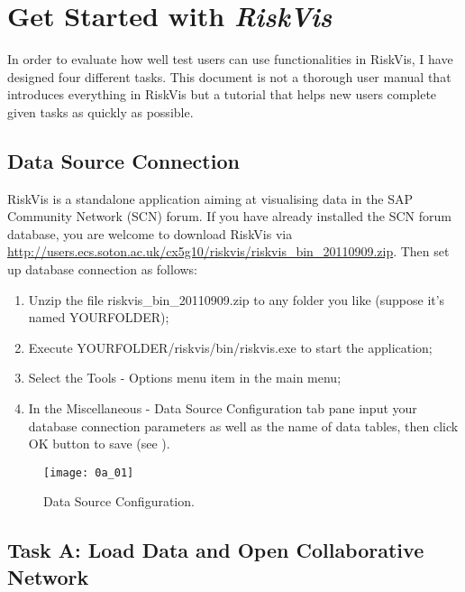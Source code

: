 \chapter{Get Started with \emph{RiskVis}} \label{Chapter:AppendixA}

In order to evaluate how well test users can use functionalities in RiskVis, I have designed four different tasks. This document is not a thorough user manual that introduces everything in RiskVis but a tutorial that helps new users complete given tasks as quickly as possible.

\section{Data Source Connection}

RiskVis is a standalone application aiming at visualising data in the SAP Community Network (SCN) forum. If you have already installed the SCN forum database, you are welcome to download RiskVis via \url{http://users.ecs.soton.ac.uk/cx5g10/riskvis/riskvis_bin_20110909.zip}. Then set up database connection as follows:

\begin{enumerate}
	\item Unzip the file riskvis\_bin\_20110909.zip to any folder you like (suppose it's named YOURFOLDER); \\
	\item Execute YOURFOLDER/riskvis/bin/riskvis.exe to start the application; \\
	\item Select the Tools - Options menu item in the main menu; \\
	\item In the Miscellaneous - Data Source Configuration tab pane input your database connection parameters as well as the name of data tables, then click OK button to save (see ).
\end{enumerate}

\begin{figure}[!htb]
  \centering
  \texttt{[image: 0a\_01]}
  \caption{Data Source Configuration.}
  \label{Figure:0a_01}
\end{figure}

\section{Task A: Load Data and Open Collaborative Network}

